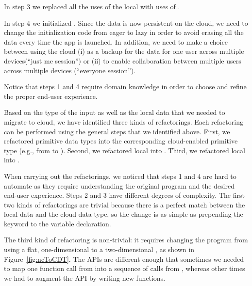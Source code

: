 \documentclass[article]{sigplanconf}
\begin{document}
In step 3 we replaced all the uses of the local  with uses of . 

In step 4 we initialized  . 
Since the data is now persistent on the cloud, we need to change the initialization code from 
eager to lazy in order to avoid erasing all the data every time the app is launched.  
In addition, we need to make a choice between using the cloud (i) as a backup for the data for one user across multiple devices(``just me session'') or (ii) to enable collaboration between multiple users across multiple devices (``everyone session'').  

Notice that steps 1 and 4 require domain knowledge in order to choose and refine the proper end-user experience.  
 
Based on the type of the input as well as the local data that we needed to migrate to cloud, we have identified three kinds of refactorings. Each refactoring can be performed using the general steps that we identified above. First, we refactored primitive data 
types into the corresponding cloud-enabled primitive type (e.g., from  to ).
Second, we refactored local  into . Third, we refactored local 
into .

When carrying out the refactorings, we noticed that steps 1 and 4 are hard to automate as they require understanding the original program and the desired end-user experience. 
Steps 2 and 3 have different degrees of complexity. 
The first two kinds of refactorings  are trivial because there is a perfect match between the local data and the cloud data type, so the change is as simple as prepending the keyword  to the variable declaration. 

The third kind of refactoring is non-trivial: it requires changing the program from using a flat, one-dimensional  to a two-dimensional , as shown in Figure~\ref{fig:ncToCDT}.
 The APIs are different enough that sometimes we needed to map one function call from  into a sequence of calls from , whereas other times we had to augment the API by writing new functions. 
 
\end{document}
